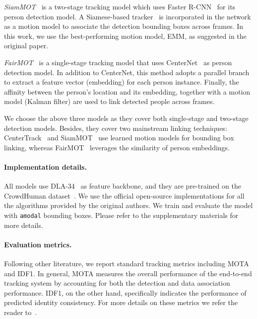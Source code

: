 \documentclass[runningheads]{llncs}
\begin{document}
\textit{SiamMOT~\cite{siammot}} is a two-stage tracking model which uses Faster R-CNN~\cite{fasterrcnn} for its person detection model. A Siamese-based tracker~\cite{held2016learning,siamcar} is incorporated in the network as a motion model to associate the detection bounding boxes across frames. In this work, we use the best-performing motion model, EMM, as suggested in the original paper.


\textit{FairMOT~\cite{fairmot}} is a single-stage tracking model that uses CenterNet~\cite{centernet} as person detection model. In addition to CenterNet, this method adopts a parallel branch to extract a feature vector (embedding) for each person instance. Finally, the affinity between the person's location and its embedding, together with a motion model (Kalman filter) are used to link detected people across frames.

We choose the above three models as they cover both single-stage and two-stage detection models. Besides, they cover two mainstream linking techniques: CenterTrack~\cite{centertrack} and SiamMOT~\cite{siammot} use learned motion models for bounding box linking,  whereas FairMOT~\cite{fairmot} leverages the similarity of person embeddings.  

\paragraph{\textbf{Implementation details.}} All models use DLA-34~\cite{dla} as feature backbone, and they are pre-trained on the CrowdHuman dataset~\cite{shao2018crowdhuman}. We use the official open-source implementations for all the algorithms provided by the original authors. 
We train and evaluate the model with \texttt{amodal} bounding boxes. Please refer to the supplementary materials for more details. 

\paragraph{\textbf{Evaluation metrics.}} Following other literature, we report standard tracking metrics including MOTA and IDF1. In general, MOTA measures the overall performance of the end-to-end tracking system by accounting for both the detection and data association performance. IDF1, on the other hand, specifically indicates the performance of predicted identity consistency. For more details on these metrics we refer the reader to~\cite{mota,idf1}. 
\end{document}
